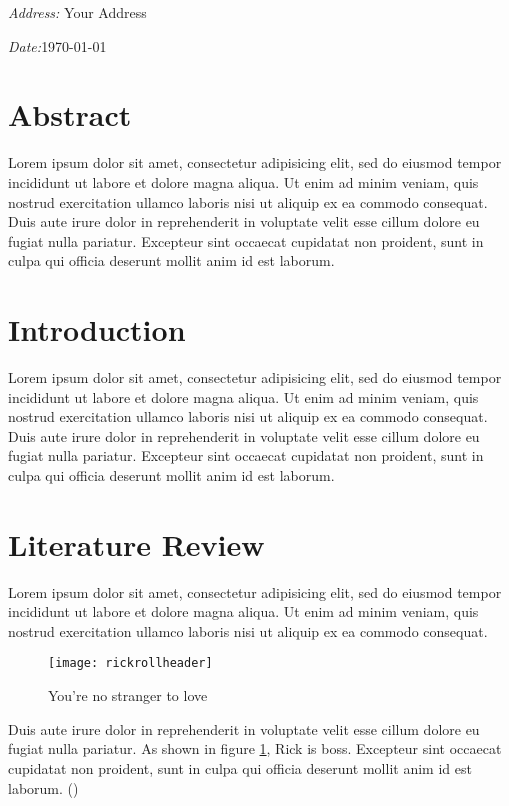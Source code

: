 \documentclass[12pt,a4paper]{article}
\begin{document}
		\textit{Address:} Your Address

		\textit{Date:}\today\par
		\endgroup
		\clearpage
	\section{Abstract}
		Lorem ipsum dolor sit amet, consectetur adipisicing elit, sed do eiusmod tempor incididunt ut labore et dolore magna aliqua. Ut enim ad minim veniam, quis nostrud exercitation ullamco laboris nisi ut aliquip ex ea commodo consequat. Duis aute irure dolor in reprehenderit in voluptate velit esse cillum dolore eu fugiat nulla pariatur. Excepteur sint occaecat cupidatat non proident, sunt in culpa qui officia deserunt mollit anim id est laborum.
		\clearpage
	\singlespacing
	\tableofcontents
	\clearpage
	\listoffigures
	\clearpage
	\listoftables
	\clearpage
	\onehalfspacing
	\section{Introduction}
		Lorem ipsum dolor sit amet, consectetur adipisicing elit, sed do eiusmod tempor incididunt ut labore et dolore magna aliqua. Ut enim ad minim veniam, quis nostrud exercitation ullamco laboris nisi ut aliquip ex ea commodo consequat. Duis aute irure dolor in reprehenderit in voluptate velit esse cillum dolore eu fugiat nulla pariatur. Excepteur sint occaecat cupidatat non proident, sunt in culpa qui officia deserunt mollit anim id est laborum.
		\clearpage
	\section{Literature Review}
		Lorem ipsum dolor sit amet, consectetur adipisicing elit, sed do eiusmod tempor incididunt ut labore et dolore magna aliqua. Ut enim ad minim veniam, quis nostrud exercitation ullamco laboris nisi ut aliquip ex ea commodo consequat.
		\begin{figure}[h]
			\centering
			\texttt{[image: rickrollheader]}
			\caption{You're no stranger to love}
			\label{fig:rick}
		\end{figure}
		Duis aute irure dolor in reprehenderit in voluptate velit esse cillum dolore eu fugiat nulla pariatur. As shown in figure \ref{fig:rick}, Rick is boss. Excepteur sint occaecat cupidatat non proident, sunt in culpa qui officia deserunt mollit anim id est laborum. (\cite{examplecitation2})
		\clearpage
\end{document}
